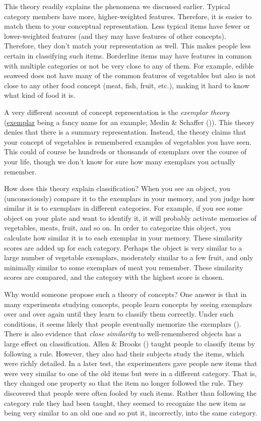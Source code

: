\documentclass[
]{krantz}
\begin{document}
This theory readily explains the phenomena we discussed earlier. Typical category members have more, higher-weighted features. Therefore, it is easier to match them to your conceptual representation. Less typical items have fewer or lower-weighted features (and they may have features of other concepts). Therefore, they don't match your representation as well. This makes people less certain in classifying such items. Borderline items may have features in common with multiple categories or not be very close to any of them. For example, edible seaweed does not have many of the common features of vegetables but also is not close to any other food concept (meat, fish, fruit, etc.), making it hard to know what kind of food it is.

A very different account of concept representation is the \emph{exemplar theory} (\hyperref[exemplar]{exemplar} being a fancy name for an example; Medin \& Schaffer ()). This theory denies that there is a summary representation. Instead, the theory claims that your concept of vegetables is remembered examples of vegetables you have seen. This could of course be hundreds or thousands of exemplars over the course of your life, though we don't know for sure how many exemplars you actually remember.

How does this theory explain classification? When you see an object, you (unconsciously) compare it to the exemplars in your memory, and you judge how similar it is to exemplars in different categories. For example, if you see some object on your plate and want to identify it, it will probably activate memories of vegetables, meats, fruit, and so on. In order to categorize this object, you calculate how similar it is to each exemplar in your memory. These similarity scores are added up for each category. Perhaps the object is very similar to a large number of vegetable exemplars, moderately similar to a few fruit, and only minimally similar to some exemplars of meat you remember. These similarity scores are compared, and the category with the highest score is chosen.

Why would someone propose such a theory of concepts? One answer is that in many experiments studying concepts, people learn concepts by seeing exemplars over and over again until they learn to classify them correctly. Under such conditions, it seems likely that people eventually memorize the exemplars (). There is also evidence that \emph{close similarity} to well-remembered objects has a large effect on classification. Allen \& Brooks () taught people to classify items by following a rule. However, they also had their subjects study the items, which were richly detailed. In a later test, the experimenters gave people new items that were very similar to one of the old items but were in a different category. That is, they changed one property so that the item no longer followed the rule. They discovered that people were often fooled by such items. Rather than following the category rule they had been taught, they seemed to recognize the new item as being very similar to an old one and so put it, incorrectly, into the same category.
\end{document}
